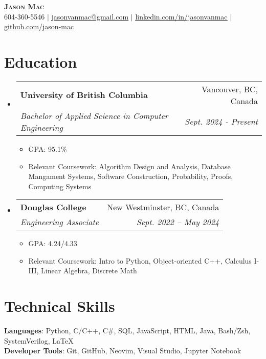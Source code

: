 \documentclass[letterpaper,11pt]{article}
\makeatletter
\newcommand{\resumeItem}[1]{
  \item\small{
    {#1 \vspace{-2pt}}
  }
}
\newcommand{\resumeSubheading}[4]{
  \vspace{-2pt}\item
    \begin{tabular*}{0.97\textwidth}[t]{l@{\extracolsep{\fill}}r}
      \textbf{#1} & #2 \\
      \textit{\small#3} & \textit{\small #4} \\
    \end{tabular*}\vspace{-7pt}
}
\newcommand{\resumeSubHeadingListStart}{\begin{itemize}[leftmargin=0.15in, label={}]}
\newcommand{\resumeSubHeadingListEnd}{\end{itemize}}
\newcommand{\resumeItemListStart}{\begin{itemize}}
\newcommand{\resumeItemListEnd}{\end{itemize}\vspace{-5pt}}
\makeatother
\begin{document}

\begin{center}
	\textbf{\Huge \scshape Jason Mac} \\ \vspace{1pt}
	\small 604-360-5546 $|$ \href{jasonvanmac:@gmail.com}{\underline{jasonvanmac@gmail.com}} $|$
	\href{https://www.linkedin.com/in/jasonvanmac}{\underline{linkedin.com/in/jasonvanmac}} $|$
	\href{https://github.com/jason-mac}{\underline{github.com/jason-mac}}
\end{center}


\section{Education}
\resumeSubHeadingListStart
\resumeSubheading
{University of British Columbia}{Vancouver, BC, Canada}
{Bachelor of Applied Science in Computer Engineering}{Sept. 2024 - Present}
\resumeItemListStart
\resumeItem{GPA: 95.1\%}
\resumeItem{Relevant Coursework: Algorithm Design and Analysis, Database Mangament Systems, Software Construction, Probability, Proofs, Computing Systems }
\resumeItemListEnd

\resumeSubheading
{Douglas College}{New Westminster, BC, Canada}
{Engineering Associate}{Sept. 2022 -- May 2024}
\resumeItemListStart
\resumeItem{GPA: 4.24/4.33}
\resumeItem{Relevant Coursework: Intro to Python, Object-oriented C++, Calculus I-III, Linear Algebra, Discrete Math}
\resumeItemListEnd
\resumeSubHeadingListEnd


\section{Technical Skills}
\begin{itemize}[leftmargin=0.15in, label={}]
	\small{\item{
	      \textbf{Languages}{: Python, C/C++, C\#, SQL, JavaScript, HTML, Java, Bash/Zsh, SystemVerilog, \LaTeX} \\
	      \textbf{Developer Tools}{: Git, GitHub, Neovim, Visual Studio, Jupyter Notebook} \\
	      }}
\end{itemize}
\end{document}
